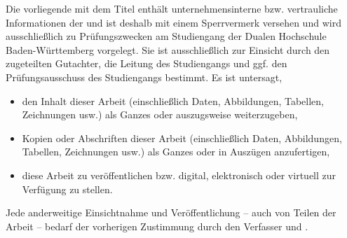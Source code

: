 Die vorliegende \sDocumentTypePhrase{} mit dem Titel \emph{\setDocumentTitle}
enthält unternehmensinterne bzw. vertrauliche Informationen der 
\setCompanyName{} und ist deshalb mit einem Sperrvermerk versehen und wird
ausschließlich zu Prüfungszwecken am Studiengang \setDepartment{} der Dualen
Hochschule Baden-Württemberg {\setLocationUniversity} vorgelegt.
Sie ist ausschließlich zur Einsicht durch den zugeteilten Gutachter, die
Leitung des Studiengangs und ggf. den Prüfungsausschuss des Studiengangs 
bestimmt.
Es ist untersagt,

\begin{itemize}
    \item den Inhalt dieser Arbeit (einschließlich Daten, Abbildungen, 
    Tabellen, Zeichnungen usw.) als Ganzes oder auszugsweise weiterzugeben,
    \item Kopien oder Abschriften dieser Arbeit (einschließlich Daten,
    Abbildungen, Tabellen, Zeichnungen usw.) als Ganzes oder in Auszügen
    anzufertigen,
    \item diese Arbeit zu veröffentlichen bzw. digital, elektronisch oder
    virtuell zur Verfügung zu stellen.
\end{itemize}

Jede anderweitige Einsichtnahme und Veröffentlichung -- auch von Teilen der
Arbeit -- bedarf der vorherigen Zustimmung durch den Verfasser und
\setCompanyName{}.